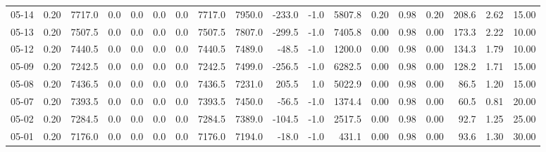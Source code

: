 \begin{threeparttable}
{\begin{tabular}{lrrrrrrrrrrrrrrrrr}
  05-14 &     0.20 & 7717.0 &               0.0 &               0.0 &                0.0 &                0.0 & 7717.0 & 7950.0 &     -233.0 &                     -1.0 &              5807.8 &       0.20 &      0.98 &           0.20 &            208.6 &            2.62 &                  15.00 \\
  05-13 &     0.20 & 7507.5 &               0.0 &               0.0 &                0.0 &                0.0 & 7507.5 & 7807.0 &     -299.5 &                     -1.0 &              7405.8 &       0.00 &      0.98 &           0.00 &            173.3 &            2.22 &                  10.00 \\
  05-12 &     0.20 & 7440.5 &               0.0 &               0.0 &                0.0 &                0.0 & 7440.5 & 7489.0 &      -48.5 &                     -1.0 &              1200.0 &       0.00 &      0.98 &           0.00 &            134.3 &            1.79 &                  10.00 \\
  05-09 &     0.20 & 7242.5 &               0.0 &               0.0 &                0.0 &                0.0 & 7242.5 & 7499.0 &     -256.5 &                     -1.0 &              6282.5 &       0.00 &      0.98 &           0.00 &            128.2 &            1.71 &                  15.00 \\
  05-08 &     0.20 & 7436.5 &               0.0 &               0.0 &                0.0 &                0.0 & 7436.5 & 7231.0 &      205.5 &                      1.0 &              5022.9 &       0.00 &      0.98 &           0.00 &             86.5 &            1.20 &                  15.00 \\
  05-07 &     0.20 & 7393.5 &               0.0 &               0.0 &                0.0 &                0.0 & 7393.5 & 7450.0 &      -56.5 &                     -1.0 &              1374.4 &       0.00 &      0.98 &           0.00 &             60.5 &            0.81 &                  20.00 \\
  05-02 &     0.20 & 7284.5 &               0.0 &               0.0 &                0.0 &                0.0 & 7284.5 & 7389.0 &     -104.5 &                     -1.0 &              2517.5 &       0.00 &      0.98 &           0.00 &             92.7 &            1.25 &                  25.00 \\
  05-01 &     0.20 & 7176.0 &               0.0 &               0.0 &                0.0 &                0.0 & 7176.0 & 7194.0 &      -18.0 &                     -1.0 &               431.1 &       0.00 &      0.98 &           0.00 &             93.6 &            1.30 &                  30.00 \\

\end{tabular}}
\end{threeparttable}
